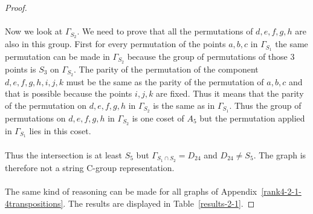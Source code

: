 \begin{proof}
  \paragraph{}
  Now we look at $\Gamma_{S_2}$. We need to prove that all the permutations of $d,e,f,g,h$ are also in this group. First for every permutation of the points $a,b,c$ in $\Gamma_{S_1}$ the same permutation can be made in $\Gamma_{S_2}$ because the group of permutations of those 3 points is $S_3$ on $\Gamma_{S_2}$. The parity of the permutation of the component $d,e,f,g,h,i,j,k$ must be the same as the parity of the permutation of $a,b,c$ and that is possible because the points $i,j,k$ are fixed. Thus it means that the parity of the permutation on $d,e,f,g,h$ in $\Gamma_{S_2}$ is the same as in $\Gamma_{S_1}$. Thus the group of permutations on $d,e,f,g,h$ in $\Gamma_{S_2}$ is one coset of $A_5$ but the permutation applied in $\Gamma_{S_1}$ lies in this coset.

  \paragraph{}
  Thus the intersection is at least $S_5$ but $\Gamma_{S_1 \cap S_2} = D_{24}$ and $D_{24} \neq S_5$. The graph is therefore not a string C-group representation.

  \paragraph{}
  The same kind of reasoning can be made for all graphs of Appendix~\ref{rank4-2-1-4transpositions}. The results are displayed in Table~\ref{results-2-1}.


\end{proof}
